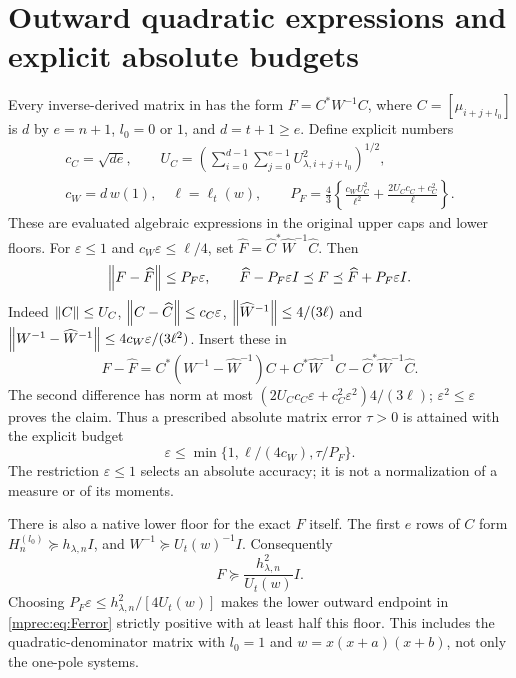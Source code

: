 \documentclass[11pt]{article}
\begin{document}
\section{Outward quadratic expressions and explicit absolute budgets}

Every inverse-derived matrix in \cite{mprec:FM} has the form
$F=C^*W^{-1}C$, where $C=[\mu_{i+j+l_0}]$ is $d$ by $e=n+1$,
$l_0=0$ or $1$, and $d=t+1\ge e$. Define explicit numbers
\begin{equation}\label{mprec:eq:P}
 \begin{gathered}
 c_C=\sqrt{de},\qquad
 U_C=\left(\sum_{i=0}^{d-1}\sum_{j=0}^{e-1}
                     U_{\lambda,i+j+l_0}^{2}\right)^{1/2},\\
 c_W=d\,w(1),\quad \ell=\ell_t(w),\qquad
 P_F=\frac43\left\{\frac{c_WU_C^2}{\ell^2}
                  +\frac{2U_Cc_C+c_C^2}{\ell}\right\}.
 \end{gathered}
\end{equation}
These are evaluated algebraic expressions in the original upper
caps and lower floors. For $\varepsilon\le1$ and
$c_W\varepsilon\le\ell/4$, set
$\widehat F=\widehat C^*\widehat W^{-1}\widehat C$.
Then
\begin{equation}\label{mprec:eq:Ferror}
 \left\lVert F-\widehat F\right\rVert\le P_F\varepsilon,
 \qquad \widehat F-P_F\varepsilon I\preceq F
 \preceq\widehat F+P_F\varepsilon I.
\end{equation}
Indeed $\left\lVert C\right\rVert\le U_C$, $\left\lVert C-\widehat C\right\rVert\le c_C\varepsilon$,
$\left\lVert\widehat W^{-1}\right\rVert\le4/(3\ell)$ and
$\left\lVert W^{-1}-\widehat W^{-1}\right\rVert\le4c_W\varepsilon/(3\ell^2)$.
Insert these in
\[
 F-\widehat F=C^*(W^{-1}-\widehat W^{-1})C
              +C^*\widehat W^{-1}C-
                    \widehat C^*\widehat W^{-1}\widehat C.
\]
The second difference has norm at most
$(2U_Cc_C\varepsilon+c_C^2\varepsilon^2)4/(3\ell)$;
$\varepsilon^2\le\varepsilon$ proves the claim. Thus a prescribed
absolute matrix error $\tau>0$ is attained with the explicit budget
\begin{equation}\label{mprec:eq:budgetF}
 \varepsilon\le\min\{1,\ell/(4c_W),\tau/P_F\}.
\end{equation}
The restriction $\varepsilon\le1$ selects an absolute accuracy;
it is not a normalization of a measure or of its moments.

There is also a native lower floor for the exact $F$ itself. The
first $e$ rows of $C$ form $H_n^{(l_0)}\succeq h_{\lambda,n}I$,
and $W^{-1}\succeq U_t(w)^{-1}I$. Consequently
\begin{equation}\label{mprec:eq:Ffloor}
 F\succeq\frac{h_{\lambda,n}^2}{U_t(w)}I.
\end{equation}
Choosing $P_F\varepsilon\le h_{\lambda,n}^2/[4U_t(w)]$
makes the lower outward endpoint in \eqref{mprec:eq:Ferror} strictly
positive with at least half this floor. This includes the
quadratic-denominator matrix with $l_0=1$ and
$w=x(x+a)(x+b)$, not only the one-pole systems.
\end{document}
